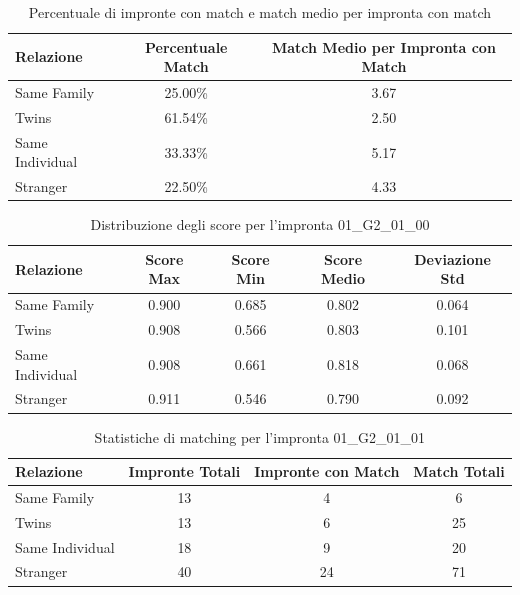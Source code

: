 \begin{table}[htbp]
\centering
\caption{Percentuale di impronte con match e match medio per impronta con match}
\label{tab:match_percentage_01_G2_01_00}
\begin{tabular}{|l|c|c|}
\hline
\textbf{Relazione} & \textbf{Percentuale Match} & \textbf{Match Medio per Impronta con Match} \\
\hline
Same Family & 25.00\% & 3.67 \\
\hline
Twins & 61.54\% & 2.50 \\
\hline
Same Individual & 33.33\% & 5.17 \\
\hline
Stranger & 22.50\% & 4.33 \\
\hline
\end{tabular}
\end{table}


\begin{table}[htbp]
\centering
\caption{Distribuzione degli score per l'impronta 01\_G2\_01\_00}
\label{tab:scores_01_G2_01_00}
\begin{tabular}{|l|c|c|c|c|}
\hline
\textbf{Relazione} & \textbf{Score Max} & \textbf{Score Min} & \textbf{Score Medio} & \textbf{Deviazione Std} \\
\hline
Same Family & 0.900 & 0.685 & 0.802 & 0.064 \\
\hline
Twins & 0.908 & 0.566 & 0.803 & 0.101 \\
\hline
Same Individual & 0.908 & 0.661 & 0.818 & 0.068 \\
\hline
Stranger & 0.911 & 0.546 & 0.790 & 0.092 \\
\hline
\end{tabular}
\end{table}


\begin{table}[htbp]
\centering
\caption{Statistiche di matching per l'impronta 01\_G2\_01\_01}
\label{tab:results_01_G2_01_01}
\begin{tabular}{|l|c|c|c|}
\hline
\textbf{Relazione} & \textbf{Impronte Totali} & \textbf{Impronte con Match} & \textbf{Match Totali} \\
\hline
Same Family & 13 & 4 & 6 \\
\hline
Twins & 13 & 6 & 25 \\
\hline
Same Individual & 18 & 9 & 20 \\
\hline
Stranger & 40 & 24 & 71 \\
\hline
\end{tabular}
\end{table}


